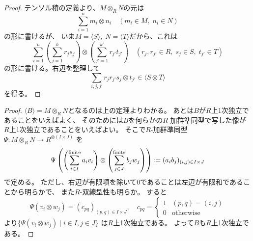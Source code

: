 \documentclass[report]{jlreq}
\begin{document}
\begin{proof}
    テンソル積の定義より、$M \otimes_R N$の元は
    \begin{equation}
        \sum_{i = 1}^n m_i \otimes n_i
            \quad
            (m_i \in M, \; n_i \in N)
    \end{equation}
    の形に書けるが、
    いま$M = \langle S \rangle, \; N = \langle T \rangle$だから、これは
    \begin{equation}
        \sum_{i = 1}^n
            \left(
                \sum_{j = 1}^k r_{j} s_{j}
            \right)
            \otimes
            \left(
                \sum_{j' = 1}^{k'} r_{j'} t_{j'}
            \right)
            \quad
            (r_j, r_{j'} \in R, \; s_j \in S, \; t_{j'} \in T)
    \end{equation}
    の形に書ける。右辺を整理して
    \begin{equation}
        \sum_{i, j, j'} r_{j} r_{j'} s_{j} \otimes t_{j'}
            \in \langle S \otimes T \rangle
    \end{equation}
    を得る。
\end{proof}


\begin{proof}
    $\langle B \rangle = M \otimes_R N$となるのは上の定理よりわかる。
    あとは$B$が$R$上1次独立であることをいえばよく、
    そのためには$B$を何らかの$R$-加群準同型で写した像が
    $R$上1次独立であることをいえばよい。
    そこで$R$-加群準同型
    $\Psi \colon M \otimes_R N \to R^{\otimes (I \times J)}$
    を
    \begin{equation}
        \Psi\left(
            \left(
                \sum^{\text{finite}}_{i \in I} a_i v_i
            \right)
            \otimes
            \left(
                \sum^{\text{finite}}_{j \in J} b_j w_j
            \right)
        \right)
            \coloneqq (a_i b_j)_{(i, j) \in I \times J}
    \end{equation}
    で定める。
    ただし、右辺が有限項を除いて$0$であることは左辺が有限和であることから明らかで、
    また$R$-双線型性も明らか。
    すると
    \begin{equation}
        \Psi(v_i \otimes w_j) = (c_{pq})_{(p, q) \in I \times J},
            \quad
            c_{pq} = \begin{cases}
                1 & (p, q) = (i, j) \\
                0 & \text{otherwise}
            \end{cases}
    \end{equation}
    より$\{ \Psi(v_i \otimes w_j) \mid i \in I, j \in J \}$
    は$R$上1次独立である。
    よって$B$も$R$上1次独立である。
\end{proof}
\end{document}

